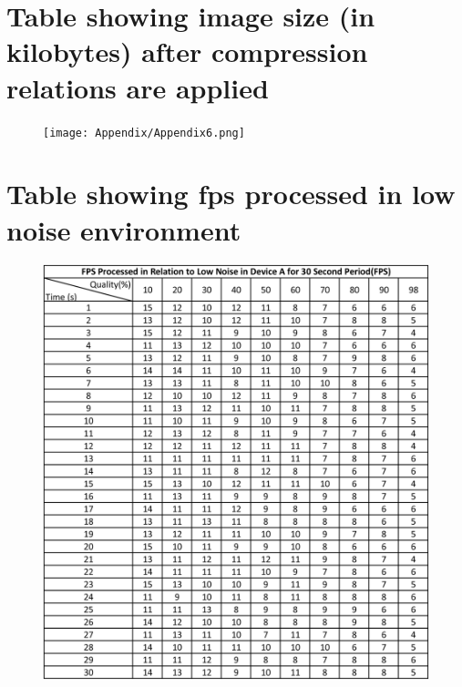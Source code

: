 \documentclass[a4paper,12pt]{article}
\begin{document}
\begin{appendices}
\newpage
\chapter{Table showing image size (in kilobytes) after compression relations are applied}

\begin{figure}[h!]
\centering
\texttt{[image: Appendix/Appendix6.png]}
\end{figure}

\newpage
\chapter{Table showing fps processed in low noise environment }

\begin{figure}[h!]
\centering
\includegraphics[scale=.9]{Appendix/Appendix7.png}
\end{figure}
\end{appendices}
\end{document}
